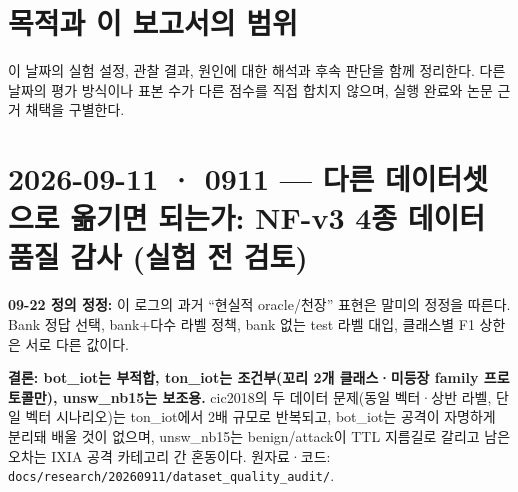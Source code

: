 




\section*{목적과 이 보고서의 범위}

이 날짜의 실험 설정, 관찰 결과, 원인에 대한 해석과 후속 판단을 함께 정리한다. 다른 날짜의 평가 방식이나 표본 수가 다른 점수를 직접 합치지 않으며, 실행 완료와 논문 근거 채택을 구별한다.


\section{2026-09-11 · 0911 — 다른 데이터셋으로 옮기면 되는가: NF-v3 4종 데이터 품질 감사 (실험 전 검토)}
\label{report:20260911_0911}
\textbf{09-22 정의 정정:} 이 로그의 과거 “현실적 oracle/\allowbreak{}천장” 표현은 말미의 정정을 따른다. Bank 정답 선택, bank+\allowbreak{}다수 라벨 정책, bank 없는 test 라벨 대입, 클래스별 F1 상한은 서로 다른 값이다.



\textbf{결론: bot\_\allowbreak{}iot는 부적합, ton\_\allowbreak{}iot는 조건부(꼬리 2개 클래스·미등장 family 프로토콜만), unsw\_\allowbreak{}nb15는 보조용.} cic2018의 두 데이터 문제(동일 벡터·상반 라벨, 단일 벡터 시나리오)는 ton\_\allowbreak{}iot에서 2배 규모로 반복되고, bot\_\allowbreak{}iot는 공격이 자명하게 분리돼 배울 것이 없으며, unsw\_\allowbreak{}nb15는 benign/\allowbreak{}attack이 TTL 지름길로 갈리고 남은 오차는 IXIA 공격 카테고리 간 혼동이다. 원자료·코드: \texttt{docs/\allowbreak{}\allowbreak{}res\allowbreak{}earch/\allowbreak{}\allowbreak{}20\allowbreak{}260911/\allowbreak{}\allowbreak{}d\allowbreak{}ataset\_\allowbreak{}\allowbreak{}q\allowbreak{}uality\_\allowbreak{}\allowbreak{}a\allowbreak{}udit/\allowbreak{}\allowbreak{}}.

